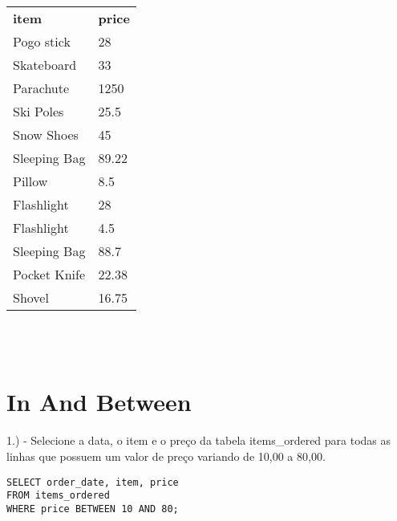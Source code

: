 \begin{tabular}{ll}
    {\textbf{item}} & {\textbf{price}} \\
    {Pogo stick}    & {28}             \\
    {Skateboard}    & {33}             \\
    {Parachute}     & {1250}           \\
    {Ski Poles}     & {25.5}           \\
    {Snow Shoes}    & {45}             \\
    {Sleeping Bag}  & {89.22}          \\
    {Pillow}        & {8.5}            \\
    {Flashlight}    & {28}             \\
    {Flashlight}    & {4.5}            \\
    {Sleeping Bag}  & {88.7}           \\
    {Pocket Knife}  & {22.38}          \\
    {Shovel}        & {16.75}         
\end{tabular} \\ \\


\section{In And Between}

1.) - Selecione a data, o item e o preço da tabela items\_ordered para todas as linhas que possuem um valor de preço variando de 10,00 a 80,00.

\begin{lstlisting}
SELECT order_date, item, price
FROM items_ordered
WHERE price BETWEEN 10 AND 80;
\end{lstlisting}


